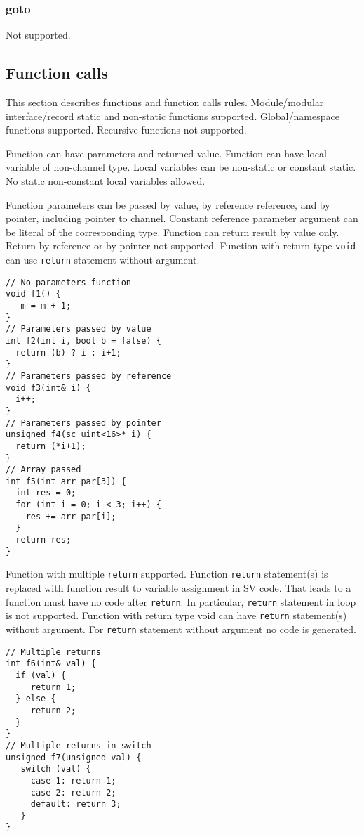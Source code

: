 \subsubsection{goto}

Not supported.

\subsection{Function calls}

This section describes functions and function calls rules. Module/modular interface/record static and non-static functions supported. Global/namespace functions supported. Recursive functions not supported.

Function can have parameters and returned value. Function can have local variable of non-channel type. Local variables can be non-static or constant static. No static non-constant local variables allowed.

Function parameters can be passed by value, by reference reference, and by pointer, including pointer to channel. Constant reference parameter argument can be literal of the corresponding type.
Function can return result by value only. Return by reference or by  pointer not supported. Function with return type {\tt void} can use {\tt return} statement without argument. 
%
\begin{lstlisting}[style=mycpp]
// No parameters function
void f1() {
   m = m + 1;
}       
// Parameters passed by value 
int f2(int i, bool b = false) {
  return (b) ? i : i+1;
}    
// Parameters passed by reference 
void f3(int& i) {
  i++;
}
// Parameters passed by pointer
unsigned f4(sc_uint<16>* i) {
  return (*i+1);
}
// Array passed 
int f5(int arr_par[3]) {
  int res = 0;
  for (int i = 0; i < 3; i++) {
    res += arr_par[i];
  }
  return res;
}
\end{lstlisting}

Function with multiple {\tt return} supported. Function {\tt return} statement(s) is replaced with function result to variable assignment in SV code.  That leads to a function must have no code after {\tt return}. In particular, {\tt return} statement in loop is not supported.  Function with return type void can have {\tt return} statement(s) without argument. For {\tt return} statement without argument no code is generated.
%
\begin{lstlisting}[style=mycpp]
// Multiple returns
int f6(int& val) {
  if (val) {
     return 1;
  } else {
     return 2;
  }
}
// Multiple returns in switch
unsigned f7(unsigned val) {
   switch (val) {
     case 1: return 1;
     case 2: return 2;
     default: return 3;
   }
}
\end{lstlisting}

